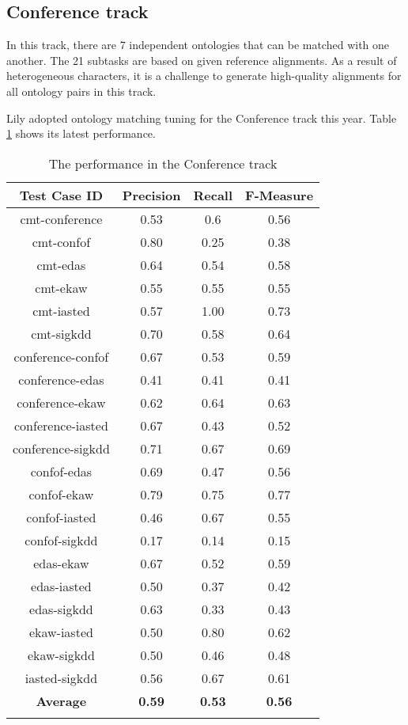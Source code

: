 \documentclass{llncs}
\begin{document}
\subsection{Conference track}
In this track, there are 7 independent ontologies that can be matched with one another. The 21 subtasks are based on given reference alignments. As a result of heterogeneous characters, it is a challenge to generate high-quality alignments for all ontology pairs in this track. \par
Lily adopted ontology matching tuning for the Conference track this year. Table \ref{tab:perf_conference} shows its latest performance. \par
\begin{table}[H]
\caption{The performance in the Conference track} \label{tab:perf_conference}
\centering
\begin{tabular}{c|c|c|c}
\Xhline{1.5pt}
Test Case ID & Precision & Recall & F-Measure \\ \hline
\Xhline{0.5pt}
cmt-conference & 0.53 & 0.6 & 0.56 \\ \hline
cmt-confof & 0.80 & 0.25 & 0.38 \\ \hline
cmt-edas & 0.64 & 0.54 & 0.58 \\ \hline
cmt-ekaw & 0.55 & 0.55 & 0.55 \\ \hline
cmt-iasted & 0.57 & 1.00 & 0.73 \\ \hline
cmt-sigkdd & 0.70 & 0.58 & 0.64 \\ \hline
conference-confof & 0.67 & 0.53 & 0.59 \\ \hline
conference-edas & 0.41 & 0.41 & 0.41 \\ \hline
conference-ekaw & 0.62 & 0.64 & 0.63 \\ \hline
conference-iasted & 0.67 & 0.43 & 0.52 \\ \hline
conference-sigkdd & 0.71 & 0.67 & 0.69 \\ \hline
confof-edas & 0.69 & 0.47 & 0.56 \\ \hline
confof-ekaw & 0.79 & 0.75 & 0.77 \\ \hline
confof-iasted & 0.46 & 0.67 & 0.55 \\ \hline
confof-sigkdd & 0.17 & 0.14 & 0.15 \\ \hline
edas-ekaw & 0.67 & 0.52 & 0.59 \\ \hline
edas-iasted & 0.50 & 0.37 & 0.42 \\ \hline
edas-sigkdd & 0.63 & 0.33 & 0.43 \\ \hline
ekaw-iasted & 0.50 & 0.80 & 0.62 \\ \hline
ekaw-sigkdd & 0.50 & 0.46 & 0.48 \\ \hline
iasted-sigkdd & 0.56 & 0.67 & 0.61 \\ \hline
\textbf{Average} & \textbf{0.59} & \textbf{0.53} & \textbf{0.56} \\
\Xhline{1.5pt}
\end{tabular}
\end{table}
\end{document}
